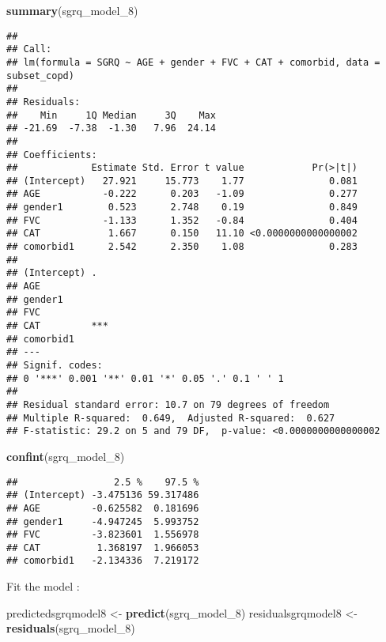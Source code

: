 \documentclass[
]{article}
\newenvironment{Shaded}{\begin{snugshade}}{\end{snugshade}}
\newcommand{\FunctionTok}[1]{\textcolor[rgb]{0.13,0.29,0.53}{\textbf{#1}}}
\newcommand{\NormalTok}[1]{#1}
\newcommand{\OtherTok}[1]{\textcolor[rgb]{0.56,0.35,0.01}{#1}}
\begin{document}
\begin{Shaded}
\begin{Highlighting}[]
\FunctionTok{summary}\NormalTok{(sgrq\_model\_8)}
\end{Highlighting}
\end{Shaded}

\begin{verbatim}
## 
## Call:
## lm(formula = SGRQ ~ AGE + gender + FVC + CAT + comorbid, data = subset_copd)
## 
## Residuals:
##    Min     1Q Median     3Q    Max 
## -21.69  -7.38  -1.30   7.96  24.14 
## 
## Coefficients:
##             Estimate Std. Error t value            Pr(>|t|)
## (Intercept)   27.921     15.773    1.77               0.081
## AGE           -0.222      0.203   -1.09               0.277
## gender1        0.523      2.748    0.19               0.849
## FVC           -1.133      1.352   -0.84               0.404
## CAT            1.667      0.150   11.10 <0.0000000000000002
## comorbid1      2.542      2.350    1.08               0.283
##                
## (Intercept) .  
## AGE            
## gender1        
## FVC            
## CAT         ***
## comorbid1      
## ---
## Signif. codes:  
## 0 '***' 0.001 '**' 0.01 '*' 0.05 '.' 0.1 ' ' 1
## 
## Residual standard error: 10.7 on 79 degrees of freedom
## Multiple R-squared:  0.649,  Adjusted R-squared:  0.627 
## F-statistic: 29.2 on 5 and 79 DF,  p-value: <0.0000000000000002
\end{verbatim}

\begin{Shaded}
\begin{Highlighting}[]
\FunctionTok{confint}\NormalTok{(sgrq\_model\_8)}
\end{Highlighting}
\end{Shaded}

\begin{verbatim}
##                 2.5 %    97.5 %
## (Intercept) -3.475136 59.317486
## AGE         -0.625582  0.181696
## gender1     -4.947245  5.993752
## FVC         -3.823601  1.556978
## CAT          1.368197  1.966053
## comorbid1   -2.134336  7.219172
\end{verbatim}

Fit the model :

\begin{Shaded}
\begin{Highlighting}[]
\NormalTok{predictedsgrqmodel8 }\OtherTok{\textless{}{-}} \FunctionTok{predict}\NormalTok{(sgrq\_model\_8)}
\NormalTok{residualsgrqmodel8 }\OtherTok{\textless{}{-}} \FunctionTok{residuals}\NormalTok{(sgrq\_model\_8)}
\end{Highlighting}
\end{Shaded}
\end{document}
